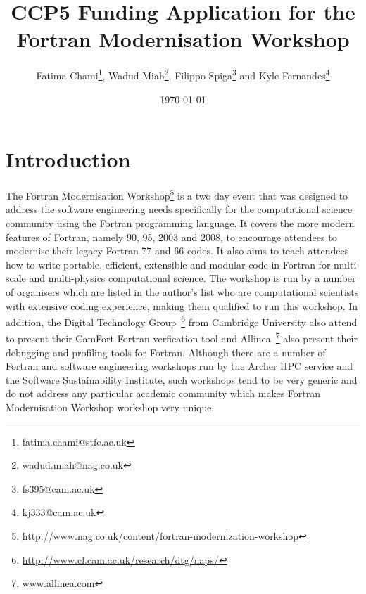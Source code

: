 \documentclass[12pt]{article}
\title{\bf CCP5 Funding Application for the Fortran Modernisation Workshop}
\author{Fatima Chami\footnote{fatima.chami@stfc.ac.uk},
  Wadud Miah\footnote{wadud.miah@nag.co.uk},
  Filippo Spiga\footnote{fs395@cam.ac.uk} and
  Kyle Fernandes\footnote{kj333@cam.ac.uk}}
\date{\today}
\begin{document}
\maketitle

%
\section{Introduction}
The Fortran Modernisation Workshop\footnote{\url{http://www.nag.co.uk/content/fortran-modernization-workshop}} is a two day event
that was designed to
address the software engineering needs specifically for the computational science community using the Fortran programming language.
It covers the more modern features of Fortran, namely 90, 95, 2003 and 2008, to encourage attendees to modernise their legacy
Fortran 77 and 66 codes. It also aims to teach attendees how to write portable, efficient, extensible and modular code in Fortran for
multi-scale and multi-physics computational science. The workshop is run by a number of organisers which are listed in the author's
list who are computational scientists with extensive coding experience, making them qualified to run this workshop. In addition, the
Digital Technology Group~\footnote{\url{http://www.cl.cam.ac.uk/research/dtg/naps/}} from Cambridge University also attend to
present their CamFort Fortran verfication tool and Allinea~\footnote{\url{www.allinea.com}} also present their debugging and
profiling tools for Fortran. Although there are a number of Fortran and software engineering workshops run by the Archer HPC
service and the Software Sustainability Institute, such workshops tend to be very generic and do not address any particular
academic community which makes Fortran Modernisation Workshop workshop very unique. \\
\end{document}
